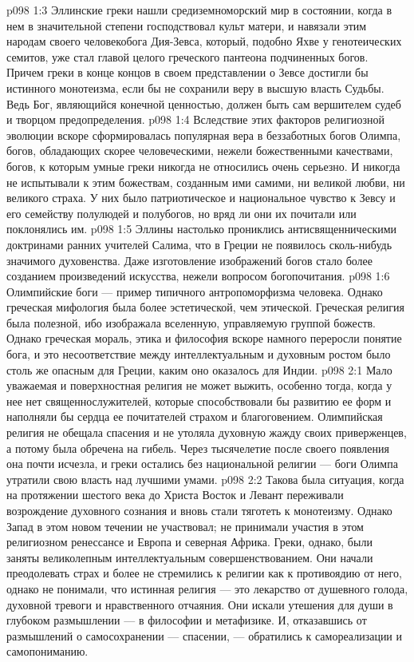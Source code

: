 \vs p098 1:3 Эллинские греки нашли средиземноморский мир в состоянии, когда в нем в значительной степени господствовал культ матери, и навязали этим народам своего человекобога Дия\hyp{}Зевса, который, подобно Яхве у генотеических семитов, уже стал главой целого греческого пантеона подчиненных богов. Причем греки в конце концов в своем представлении о Зевсе достигли бы истинного монотеизма, если бы не сохранили веру в высшую власть Судьбы. Ведь Бог, являющийся конечной ценностью, должен быть сам вершителем судеб и творцом предопределения.
\vs p098 1:4 Вследствие этих факторов религиозной эволюции вскоре сформировалась популярная вера в беззаботных богов Олимпа, богов, обладающих скорее человеческими, нежели божественными качествами, богов, к которым умные греки никогда не относились очень серьезно. И никогда не испытывали к этим божествам, созданным ими самими, ни великой любви, ни великого страха. У них было патриотическое и национальное чувство к Зевсу и его семейству полулюдей и полубогов, но вряд ли они их почитали или поклонялись им.
\vs p098 1:5 Эллины настолько прониклись антисвященническими доктринами ранних учителей Салима, что в Греции не появилось сколь\hyp{}нибудь значимого духовенства. Даже изготовление изображений богов стало более созданием произведений искусства, нежели вопросом богопочитания.
\vs p098 1:6 Олимпийские боги --- пример типичного антропоморфизма человека. Однако греческая мифология была более эстетической, чем этической. Греческая религия была полезной, ибо изображала вселенную, управляемую группой божеств. Однако греческая мораль, этика и философия вскоре намного переросли понятие бога, и это несоответствие между интеллектуальным и духовным ростом было столь же опасным для Греции, каким оно оказалось для Индии.
\vs p098 2:1 Мало уважаемая и поверхностная религия не может выжить, особенно тогда, когда у нее нет священнослужителей, которые способствовали бы развитию ее форм и наполняли бы сердца ее почитателей страхом и благоговением. Олимпийская религия не обещала спасения и не утоляла духовную жажду своих приверженцев, а потому была обречена на гибель. Через тысячелетие после своего появления она почти исчезла, и греки остались без национальной религии --- боги Олимпа утратили свою власть над лучшими умами.
\vs p098 2:2 Такова была ситуация, когда на протяжении шестого века до Христа Восток и Левант переживали возрождение духовного сознания и вновь стали тяготеть к монотеизму. Однако Запад в этом новом течении не участвовал; не принимали участия в этом религиозном ренессансе и Европа и северная Африка. Греки, однако, были заняты великолепным интеллектуальным совершенствованием. Они начали преодолевать страх и более не стремились к религии как к противоядию от него, однако не понимали, что истинная религия --- это лекарство от душевного голода, духовной тревоги и нравственного отчаяния. Они искали утешения для души в глубоком размышлении --- в философии и метафизике. И, отказавшись от размышлений о самосохранении --- спасении, --- обратились к самореализации и самопониманию.

